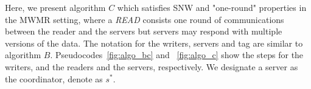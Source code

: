 Here, we present  algorithm  $C$ which satisfies  SNW and "one-round"  properties in the MWMR setting, where a \textit{READ} consists one round of communications between the reader and the servers but servers may respond with multiple versions of the data. %
The notation for the  writers, servers and tag are similar to algorithm $B$. 
Pseudocodes~\ref{fig:algo_bc} and ~\ref{fig:algo_c} show the steps for the  writers, and the readers and the servers, respectively.
%
We designate a server as the coordinator,  denote as $s^*$. 

